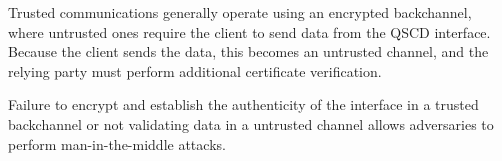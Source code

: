 Trusted communications generally operate using an encrypted backchannel, where untrusted ones require the client to send data from the QSCD interface. Because the client sends the data, this becomes an untrusted channel, and the relying party must perform additional certificate verification.

Failure to encrypt and establish the authenticity of the interface in a trusted backchannel or not validating data in a untrusted channel allows adversaries to perform man-in-the-middle attacks.


